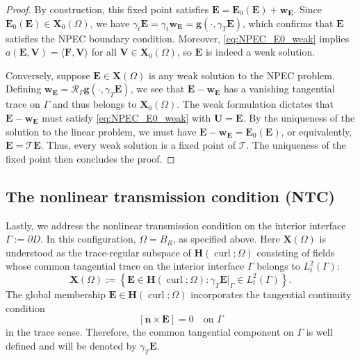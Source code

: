 \documentclass[10pt,a4paper]{amsart}
\numberwithin{equation}{section}
\begin{document}
\begin{proof}
By construction, this fixed point satisfies $\mathbf{E} = \mathbf{E}_0(\mathbf{E}) + \mathbf{w}_{\mathbf{E}}$. Since $\mathbf{E}_0(\mathbf{E}) \in \mathbf{X}_0(\Omega)$, we have $\gamma_t \mathbf{E} = \gamma_t \mathbf{w}_{\mathbf{E}} = \mathbf{g}(\cdot, \gamma_T \mathbf{E})$, which confirms that $\mathbf{E}$ satisfies the NPEC boundary condition. Moreover, \eqref{eq:NPEC_E0_weak} implies $a(\mathbf{E}, \mathbf{V}) = \langle \mathbf{F}, \mathbf{V} \rangle$ for all $\mathbf{V} \in \mathbf{X}_0(\Omega)$, so $\mathbf{E}$ is indeed a weak solution.

Conversely, suppose $\mathbf{E} \in \mathbf{X}(\Omega)$ is any weak solution to the NPEC problem. Defining $\mathbf{w}_{\mathbf{E}} = \mathcal{R}_\Gamma \mathbf{g}(\cdot, \gamma_T \mathbf{E})$, we see that $\mathbf{E} - \mathbf{w}_{\mathbf{E}}$ has a vanishing tangential trace on $\Gamma$ and thus belongs to $\mathbf{X}_0(\Omega)$. The weak formulation dictates that $\mathbf{E} - \mathbf{w}_{\mathbf{E}}$ must satisfy \eqref{eq:NPEC_E0_weak} with $\mathbf{U} = \mathbf{E}$. By the uniqueness of the solution to the linear problem, we must have $\mathbf{E} - \mathbf{w}_{\mathbf{E}} = \mathbf{E}_0(\mathbf{E})$, or equivalently, $\mathbf{E} = \mathcal{T}\mathbf{E}$. Thus, every weak solution is a fixed point of $\mathcal{T}$. The uniqueness of the fixed point then concludes the proof.
\end{proof}


\subsection{The nonlinear transmission condition (NTC)}

Lastly, we address the nonlinear transmission condition on the interior
interface \(\Gamma:=\partial D\). In this configuration, \(\Omega=B_R\), as
specified above. Here \(\mathbf X(\Omega)\) is understood as the trace-regular
subspace of \(\mathbf H(\operatorname{curl};\Omega)\) consisting of fields
whose common tangential trace on the interior interface \(\Gamma\) belongs to
\(L_t^2(\Gamma)\):
\[
\mathbf X(\Omega)
:=
\left\{
\mathbf E\in \mathbf H(\operatorname{curl};\Omega):
\gamma_T\mathbf E|_{\Gamma}\in L_t^2(\Gamma)
\right\}.
\]
The global membership \(\mathbf E\in \mathbf H(\operatorname{curl};\Omega)\)
incorporates the tangential continuity condition
\[
[\mathbf n\times \mathbf E]=0
\quad\text{on }\Gamma
\]
in the trace sense. Therefore, the common tangential component on \(\Gamma\)
is well defined and will be denoted by \(\gamma_T\mathbf E\).
\end{document}
